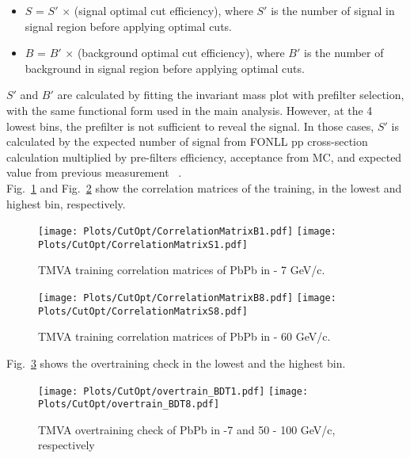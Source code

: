 \begin{itemize}
\item $S$ = $S'$ $\times$ (signal optimal cut efficiency), where $S'$ is the number of signal in signal region before applying optimal cuts.
\item $B$ = $B'$ $\times$ (background optimal cut efficiency), where $B'$ is the number of background in signal region before applying optimal cuts.
\end{itemize}

$S'$ and $B'$ are calculated by fitting the invariant mass plot with prefilter selection, with the same functional form used in the main analysis. However, at the 4 lowest \pt bins, the prefilter is not sufficient to reveal the signal. In those cases, $S'$ is calculated by the expected number of signal from FONLL pp cross-section calculation multiplied by pre-filters efficiency, acceptance from MC, and expected \raa value from previous measurement ~\cite{CMS-PAS-HIN-16-011}. \\
Fig.~\ref{fig:tmvaPbPbCorr1} and Fig.~\ref{fig:tmvaPbPbCorr8} show the correlation matrices of the training, in the lowest and highest \pt bin, respectively.

\begin{figure}[h]
\begin{center}
\texttt{[image: Plots/CutOpt/CorrelationMatrixB1.pdf]}
\texttt{[image: Plots/CutOpt/CorrelationMatrixS1.pdf]}
\caption{TMVA training correlation matrices of PbPb in  - 7 GeV/c.}
\label{fig:tmvaPbPbCorr1}
\end{center}
\end{figure}

\begin{figure}[h]
\begin{center}
\texttt{[image: Plots/CutOpt/CorrelationMatrixB8.pdf]}
\texttt{[image: Plots/CutOpt/CorrelationMatrixS8.pdf]}
\caption{TMVA training correlation matrices of PbPb in  - 60 GeV/c.}
\label{fig:tmvaPbPbCorr8}
\end{center}
\end{figure}

\clearpage
Fig.~\ref{fig:tmvaPbPbOvertrain18} shows the overtraining check in the lowest and the highest \pt bin. \\

\begin{figure}[h]
\begin{center}
\texttt{[image: Plots/CutOpt/overtrain\_BDT1.pdf]}
\texttt{[image: Plots/CutOpt/overtrain\_BDT8.pdf]}
\caption{TMVA overtraining check of PbPb in -7 and 50 - 100 GeV/c, respectively}
\label{fig:tmvaPbPbOvertrain18}
\end{center}
\end{figure}

